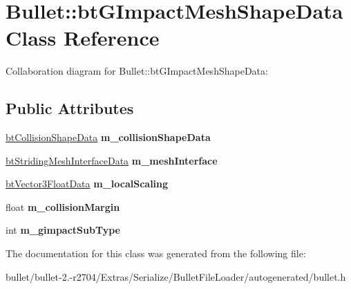 \hypertarget{class_bullet_1_1bt_g_impact_mesh_shape_data}{\section{Bullet\+:\+:bt\+G\+Impact\+Mesh\+Shape\+Data Class Reference}
\label{class_bullet_1_1bt_g_impact_mesh_shape_data}
}


Collaboration diagram for Bullet\+:\+:bt\+G\+Impact\+Mesh\+Shape\+Data\+:
\subsection*{Public Attributes}
\begin{DoxyCompactItemize}
\item 
\hypertarget{class_bullet_1_1bt_g_impact_mesh_shape_data_af49d4f005e56e8942100b3917c7c1986}{\hyperlink{class_bullet_1_1bt_collision_shape_data}{bt\+Collision\+Shape\+Data} {\bfseries m\+\_\+collision\+Shape\+Data}}\label{class_bullet_1_1bt_g_impact_mesh_shape_data_af49d4f005e56e8942100b3917c7c1986}

\item 
\hypertarget{class_bullet_1_1bt_g_impact_mesh_shape_data_a2492259e92ea2d2c60e74c1656f3272a}{\hyperlink{class_bullet_1_1bt_striding_mesh_interface_data}{bt\+Striding\+Mesh\+Interface\+Data} {\bfseries m\+\_\+mesh\+Interface}}\label{class_bullet_1_1bt_g_impact_mesh_shape_data_a2492259e92ea2d2c60e74c1656f3272a}

\item 
\hypertarget{class_bullet_1_1bt_g_impact_mesh_shape_data_aa287fc50809e9ea394d170d65e91cd6f}{\hyperlink{class_bullet_1_1bt_vector3_float_data}{bt\+Vector3\+Float\+Data} {\bfseries m\+\_\+local\+Scaling}}\label{class_bullet_1_1bt_g_impact_mesh_shape_data_aa287fc50809e9ea394d170d65e91cd6f}

\item 
\hypertarget{class_bullet_1_1bt_g_impact_mesh_shape_data_ab736cbe40584c7289ef130bebcb0bb6f}{float {\bfseries m\+\_\+collision\+Margin}}\label{class_bullet_1_1bt_g_impact_mesh_shape_data_ab736cbe40584c7289ef130bebcb0bb6f}

\item 
\hypertarget{class_bullet_1_1bt_g_impact_mesh_shape_data_a0d5c43f5beb47672ac64038d22588a64}{int {\bfseries m\+\_\+gimpact\+Sub\+Type}}\label{class_bullet_1_1bt_g_impact_mesh_shape_data_a0d5c43f5beb47672ac64038d22588a64}

\end{DoxyCompactItemize}


The documentation for this class was generated from the following file\+:\begin{DoxyCompactItemize}
\item 
bullet/bullet-\/2.-\/r2704/\+Extras/\+Serialize/\+Bullet\+File\+Loader/autogenerated/bullet.\+h\end{DoxyCompactItemize}
